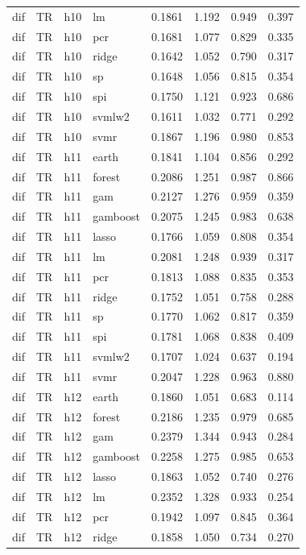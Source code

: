 \begin{ThreePartTable}
\begin{longtable}[t]{llclcccc}
dif & TR & h10 & lm & 0.1861 & 1.192 & 0.949 & 0.397\\
dif & TR & h10 & pcr & 0.1681 & 1.077 & 0.829 & 0.335\\
dif & TR & h10 & ridge & 0.1642 & 1.052 & 0.790 & 0.317\\
dif & TR & h10 & sp & 0.1648 & 1.056 & 0.815 & 0.354\\
dif & TR & h10 & spi & 0.1750 & 1.121 & 0.923 & 0.686\\
dif & TR & h10 & svmlw2 & 0.1611 & 1.032 & 0.771 & 0.292\\
dif & TR & h10 & svmr & 0.1867 & 1.196 & 0.980 & 0.853\\
\addlinespace
dif & TR & h11 & earth & 0.1841 & 1.104 & 0.856 & 0.292\\
dif & TR & h11 & forest & 0.2086 & 1.251 & 0.987 & 0.866\\
dif & TR & h11 & gam & 0.2127 & 1.276 & 0.959 & 0.359\\
dif & TR & h11 & gamboost & 0.2075 & 1.245 & 0.983 & 0.638\\
dif & TR & h11 & lasso & 0.1766 & 1.059 & 0.808 & 0.354\\
dif & TR & h11 & lm & 0.2081 & 1.248 & 0.939 & 0.317\\
dif & TR & h11 & pcr & 0.1813 & 1.088 & 0.835 & 0.353\\
dif & TR & h11 & ridge & 0.1752 & 1.051 & 0.758 & 0.288\\
dif & TR & h11 & sp & 0.1770 & 1.062 & 0.817 & 0.359\\
dif & TR & h11 & spi & 0.1781 & 1.068 & 0.838 & 0.409\\
dif & TR & h11 & svmlw2 & 0.1707 & 1.024 & 0.637 & 0.194\\
dif & TR & h11 & svmr & 0.2047 & 1.228 & 0.963 & 0.880\\
\addlinespace
dif & TR & h12 & earth & 0.1860 & 1.051 & 0.683 & 0.114\\
dif & TR & h12 & forest & 0.2186 & 1.235 & 0.979 & 0.685\\
dif & TR & h12 & gam & 0.2379 & 1.344 & 0.943 & 0.284\\
dif & TR & h12 & gamboost & 0.2258 & 1.275 & 0.985 & 0.653\\
dif & TR & h12 & lasso & 0.1863 & 1.052 & 0.740 & 0.276\\
dif & TR & h12 & lm & 0.2352 & 1.328 & 0.933 & 0.254\\
dif & TR & h12 & pcr & 0.1942 & 1.097 & 0.845 & 0.364\\
dif & TR & h12 & ridge & 0.1858 & 1.050 & 0.734 & 0.270\\

\end{longtable}
\end{ThreePartTable}

